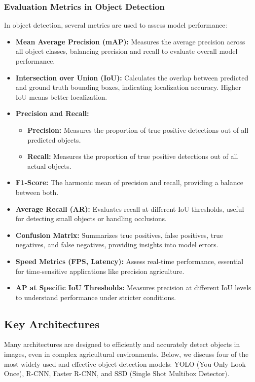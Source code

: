 \subsubsection{Evaluation Metrics in Object Detection}    
In object detection, several metrics are used to assess model performance:
\begin{itemize}
    \item \textbf{Mean Average Precision (mAP):} Measures the average precision across all object classes, balancing precision and recall to evaluate overall model performance.
    \item \textbf{Intersection over Union (IoU):} Calculates the overlap between predicted and ground truth bounding boxes, indicating localization accuracy. Higher IoU means better localization.
    \item \textbf{Precision and Recall:}
    \begin{itemize}
        \item \textbf{Precision:} Measures the proportion of true positive detections out of all predicted objects.
        \item \textbf{Recall:} Measures the proportion of true positive detections out of all actual objects.
    \end{itemize}
    \item \textbf{F1-Score:} The harmonic mean of precision and recall, providing a balance between both.
    \item \textbf{Average Recall (AR):} Evaluates recall at different IoU thresholds, useful for detecting small objects or handling occlusions.
    \item \textbf{Confusion Matrix:} Summarizes true positives, false positives, true negatives, and false negatives, providing insights into model errors.
    \item \textbf{Speed Metrics (FPS, Latency):} Assess real-time performance, essential for time-sensitive applications like precision agriculture.
    \item \textbf{AP at Specific IoU Thresholds:} Measures precision at different IoU levels to understand performance under stricter conditions.
\end{itemize}

\subsection{Key Architectures}
Many architectures are designed to efficiently and accurately detect objects in images, even in complex agricultural environments. Below, we discuss four of the most widely used and effective object detection models: YOLO (You Only Look Once), R-CNN, Faster R-CNN, and SSD (Single Shot Multibox Detector). 

